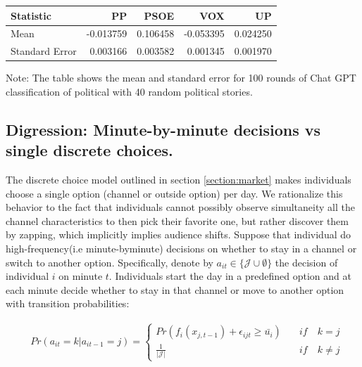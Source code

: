 \documentclass[12pt]{article}
\begin{document}
\begin{table}

\centering
\begin{tabular}{lrrrr}
	\hline
	Statistic       &       PP &     PSOE &      VOX &       UP \\
	\hline
	Mean            & -0.013759 &  0.106458 & -0.053395 &  0.024250 \\
	Standard Error  &  0.003166 &  0.003582 &  0.001345 &  0.001970 \\
	\hline
	
\end{tabular}

 \begin{tablenotes}
 	\centering
	\footnotesize
	\item Note: The table shows the mean and standard error for 100 rounds of Chat GPT classification of political with 40 random political stories.
\end{tablenotes}
\end{table}


\subsection{Digression: Minute-by-minute decisions vs single discrete choices.} \label{section:digression}




The discrete choice model outlined in section \ref{section:market} makes individuals choose a single option (channel or outside option) per day. We rationalize this behavior to the fact that individuals cannot possibly observe simultaneity all the channel characteristics to then pick their favorite one, but rather discover them by zapping, which implicitly implies audience shifts. Suppose that individual do high-frequency(i.e minute-byminute) decisions on whether to stay in a channel or switch to another option. Specifically, denote by $a_{it} \in \{\mathcal{J}\cup \emptyset\}$ the decision of individual $i$ on minute $t$. Individuals start the day in a predefined option and at each minute decide whether to stay in that channel or move to another option with transition probabilities:


\begin{equation}\label{}
	\begin{aligned}
		& Pr(a_{it}=k | a_{it-1}=j)= \begin{cases}			
			Pr(f_i(x_{j,t-1})+ \epsilon_{ijt}\geq \bar{u_i}) \quad &if \quad k=j\\
			 \frac{1}{|\mathcal{J}|} \quad& if \quad k \neq j 
			\end{cases}			
	\end{aligned}
\end{equation} 
\end{document}
